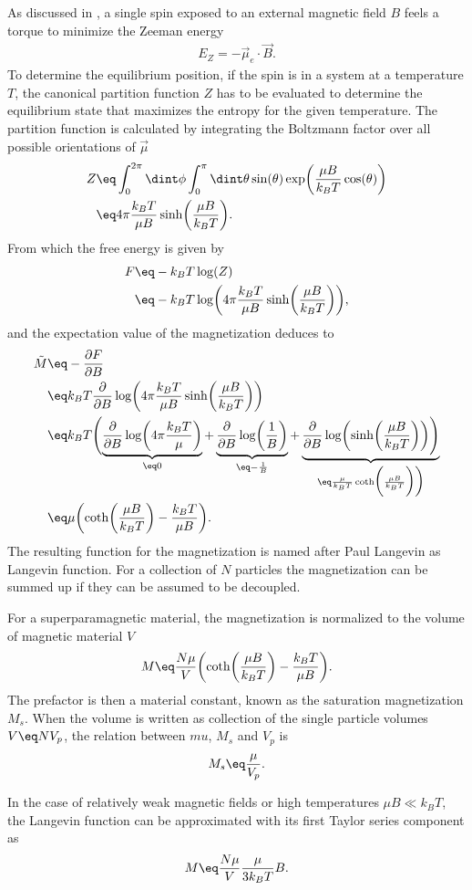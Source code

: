 \documentclass[\main/dresen_thesis.tex]{subfiles}
\begin{document}
As discussed in , a single spin exposed to an external magnetic field $B$ feels a torque to minimize the Zeeman energy
\begin{align}
  E_Z = - \vec{\mu}_e \cdot \vec{B}.
\end{align}
To determine the equilibrium position, if the spin is in a system at a temperature $T$, the canonical partition function $Z$ has to be evaluated to determine the equilibrium state that maximizes the entropy for the given temperature.
The partition function is calculated by integrating the Boltzmann factor over all possible orientations of $\vec{\mu}$
\begin{align}
  Z \eq& \int_0^{2\pi} \dint \phi \int_0^\pi \dint \theta \sin(\theta) \exp \biggl(\frac{\mu B}{k_B T} \cos(\theta) \biggr)\\
  \eq& 4 \pi \frac{k_B T}{ \mu B} \sinh \biggl( \frac{\mu B}{k_B T} \biggr).
\end{align}
From which the free energy is given by
\begin{align}
  F \eq& -k_B T \log(Z)\\
  \eq& -k_B T \log \biggl( 4 \pi \frac{k_B T}{ \mu B}  \sinh \biggl( \frac{\mu B}{k_B T} \biggr) \biggr),
\end{align}
and the expectation value of the magnetization deduces to
\begin{align}
  \tilde{M} \eq& - \frac{\partial F}{\partial B}\\
  \eq& k_B T \frac{\partial}{\partial B} \log \biggl( 4 \pi \frac{k_B T}{ \mu B}  \sinh \biggl( \frac{\mu B}{k_B T} \biggr) \biggr)\\
  \eq& k_B T \Biggl(
    \underbrace{\frac{\partial}{\partial B} \log \biggl( 4 \pi \frac{k_B T}{ \mu } \biggr)}_{\eq 0}
  + \underbrace{\frac{\partial}{\partial B} \log \biggl( \frac{1}{B} \biggr)}_{\eq - \frac{1}{B}}
  + \underbrace{\frac{\partial}{\partial B}\log  \biggl(  \sinh \biggl( \frac{\mu B}{k_B T} \biggr) \biggr) \Biggr)}_{\eq \frac{\mu }{k_B T} \coth \biggl( \frac{\mu B}{k_B T} \biggr) \biggr)}\\
  \eq& \mu \biggl(\coth \biggl( \frac{\mu B}{k_B T} \biggr) - \frac{k_B T}{\mu B} \biggr).
\end{align}
The resulting function for the magnetization is named after Paul Langevin as Langevin function.
For a collection of $N$ particles the magnetization can be summed up if they can be assumed to be decoupled.

For a superparamagnetic material, the magnetization is normalized to the volume of magnetic material $V$
\begin{align}
  M \eq \frac{N \mu}{V} \biggl(\coth \biggl( \frac{\mu B}{k_B T} \biggr) - \frac{k_B T}{\mu B} \biggr).
\end{align}
The prefactor is then a material constant, known as the saturation magnetization $M_s$.
When the volume is written as collection of the single particle volumes $V \eq N V_p$, the relation between $mu$, $M_s$ and $V_p$ is
\begin{align}
  M_s \eq \frac{\mu}{V_p}.
\end{align}

In the case of relatively weak magnetic fields or high temperatures $\mu B \ll k_B T$, the Langevin function can be approximated with its first Taylor series component as
\begin{align}
  M \eq \frac{N \mu}{V} \frac{\mu}{3 k_B T} B.
\end{align}
\end{document}

